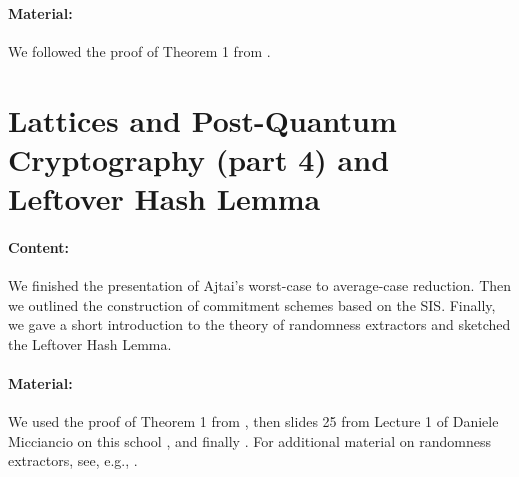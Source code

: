 \documentclass{llncs}
\begin{document}
\paragraph{Material:} We followed the proof of Theorem 1 from \cite{Goldreich2011}.

\section{Lattices and Post-Quantum Cryptography (part 4) and Leftover Hash Lemma}

\paragraph{Content:} We finished the presentation of Ajtai's worst-case to average-case reduction. Then we outlined the construction of commitment schemes based on the SIS. Finally, we gave a short introduction to the theory of randomness extractors and sketched the Leftover Hash Lemma. 

\paragraph{Material:} We used the proof of Theorem 1 from \cite{Goldreich2011}, then slides 25 from Lecture 1 of Daniele Micciancio on this school \cite{PQC}, and finally \cite{leo}. For additional material on randomness extractors, see, e.g., \cite{Shaltiel2011}.


\printbibliography %
\end{document}
